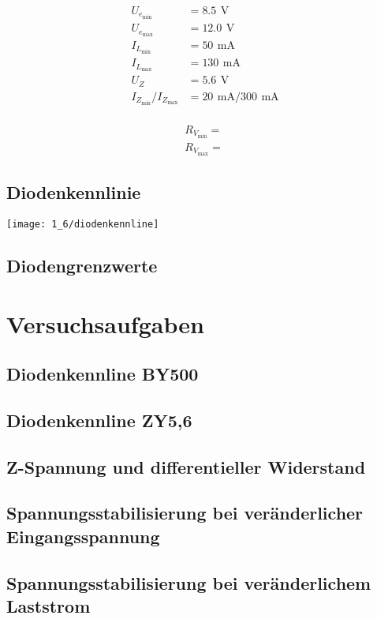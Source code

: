 \documentclass[a4paper, 12pt]{article}
\begin{document}
\begin{align*}
  U_{e_{\textrm{min}}} &= 8.5 \,\ \si{\volt}\\
  U_{e_{\textrm{max}}} &= 12.0 \,\ \si{\volt}\\
  I_{L_{\textrm{min}}} &= 50 \,\ \si{\milli\ampere}\\
  I_{L_{\textrm{max}}} &= 130 \,\ \si{\milli\ampere}\\
  U_{Z} &= 5.6 \,\ \si{\volt}\\
  I_{Z_{\textrm{min}}}/I_{Z_{\textrm{max}}} &= 20 \,\ \si{\milli\ampere} / 300 \,\ \si{\milli\ampere}\\
\end{align*}

\begin{gather*}
  R_{V_{\textrm{min}}} = \frac{}{}\\
  R_{V_{\textrm{max}}} = \frac{}{}
\end{gather*}

\subsection{Diodenkennlinie}

\begin{center}
  \texttt{[image: 1\_6/diodenkennline]}
\end{center}


\subsection{Diodengrenzwerte}


\section{Versuchsaufgaben}

\subsection{Diodenkennline BY500}

\subsection{Diodenkennline ZY5,6}

\subsection{Z-Spannung und differentieller Widerstand}

\subsection{Spannungsstabilisierung bei veränderlicher Eingangsspannung}

\subsection{Spannungsstabilisierung bei veränderlichem Laststrom}
\end{document}
